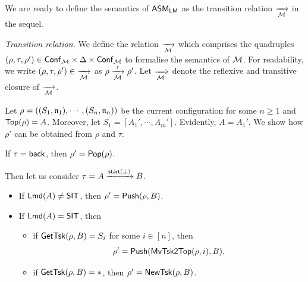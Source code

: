 We are ready to define the semantics of $\textsf{ASM}_\textsf{LM}$ as the transition relation $\xrightarrow[{\mathcal{M} }]{}$ in the sequel. 

\emph{Transition relation.} We define the relation $\xrightarrow[{\mathcal{M} }]{}$ which comprises the quadruples $(\rho, \tau, \rho') \in {\mathsf{Conf} }_{\mathcal{M} } \times \Delta  \times {\mathsf{Conf} }_{\mathcal{M} }$ to formalise the semantics of ${\mathcal{M} }$. For readability, we write $(\rho, \tau, \rho')\in\ \xrightarrow[{\mathcal{M} }]{}$  as $\rho \xrightarrow[{\mathcal{M} }]{\tau} \rho'$. 
Let $\xRightarrow[{\mathcal{M} }]{}$ denote the reflexive and transitive closure of $\xrightarrow[{\mathcal{M} }]{}$.

Let $\rho = ((S_1,\mathfrak{n}_1),\cdots,(S_n,\mathfrak{n}_n))$ be the current configuration for some $n \ge 1$ and $\mathsf{Top}(\rho) = A$. Moreover, let $S_1 = [A_1',\cdots,A_m']$. Evidently, $A = A_1'$. We show how $\rho'$ can be obtained from $\rho$ and $\tau$.

If $\tau = {\mathsf{back} }$, then $\rho' = \mathsf{Pop}(\rho)$. 

Then let us consider $\tau = A\xrightarrow{{\mathsf{start} }(\bot)}B$.




\medskip

\noindent {}
	\begin{itemize}
		\item If ${\sf Lmd}(A) \neq \mathsf{SIT}$, then $\rho'= \mathsf{Push}(\rho,B)$.
		\item If ${\sf Lmd}(A) = \mathsf{SIT}$, then
    		\begin{itemize}
    			\item if $\mathsf{GetTsk}(\rho, B)=S_i$ for some $i\in[n]$,  then 
			$$\rho'=\mathsf{Push}(\mathsf{MvTsk2Top}(\rho, i),B),$$
    			\item if $\mathsf{GetTsk}(\rho, B)=*$, then $\rho'= \mathsf{NewTsk}(\rho,B )$.
    		\end{itemize}
	\end{itemize}

